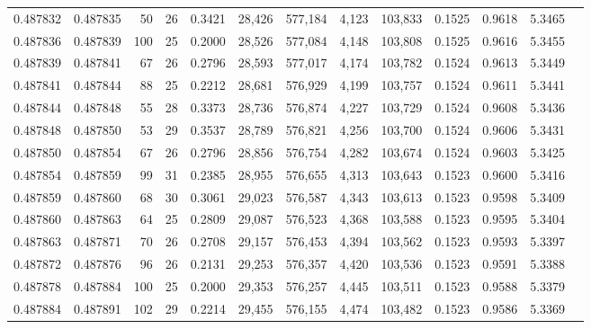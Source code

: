 \begin{tabular}{rrrrrrrrrrrrr}
0.487832 & 0.487835 &  50 &  26 &                                     0.3421 &  28,426 & 577,184 &   4,123 & 103,833 & 0.1525 & 0.9618 & 5.3465 \\
0.487836 & 0.487839 & 100 &  25 &                                     0.2000 &  28,526 & 577,084 &   4,148 & 103,808 & 0.1525 & 0.9616 & 5.3455 \\
0.487839 & 0.487841 &  67 &  26 &                                     0.2796 &  28,593 & 577,017 &   4,174 & 103,782 & 0.1524 & 0.9613 & 5.3449 \\
0.487841 & 0.487844 &  88 &  25 &                                     0.2212 &  28,681 & 576,929 &   4,199 & 103,757 & 0.1524 & 0.9611 & 5.3441 \\
0.487844 & 0.487848 &  55 &  28 &                                     0.3373 &  28,736 & 576,874 &   4,227 & 103,729 & 0.1524 & 0.9608 & 5.3436 \\
0.487848 & 0.487850 &  53 &  29 &                                     0.3537 &  28,789 & 576,821 &   4,256 & 103,700 & 0.1524 & 0.9606 & 5.3431 \\
0.487850 & 0.487854 &  67 &  26 &                                     0.2796 &  28,856 & 576,754 &   4,282 & 103,674 & 0.1524 & 0.9603 & 5.3425 \\
0.487854 & 0.487859 &  99 &  31 &                                     0.2385 &  28,955 & 576,655 &   4,313 & 103,643 & 0.1523 & 0.9600 & 5.3416 \\
0.487859 & 0.487860 &  68 &  30 &                                     0.3061 &  29,023 & 576,587 &   4,343 & 103,613 & 0.1523 & 0.9598 & 5.3409 \\
0.487860 & 0.487863 &  64 &  25 &                                     0.2809 &  29,087 & 576,523 &   4,368 & 103,588 & 0.1523 & 0.9595 & 5.3404 \\
0.487863 & 0.487871 &  70 &  26 &                                     0.2708 &  29,157 & 576,453 &   4,394 & 103,562 & 0.1523 & 0.9593 & 5.3397 \\
0.487872 & 0.487876 &  96 &  26 &                                     0.2131 &  29,253 & 576,357 &   4,420 & 103,536 & 0.1523 & 0.9591 & 5.3388 \\
0.487878 & 0.487884 & 100 &  25 &                                     0.2000 &  29,353 & 576,257 &   4,445 & 103,511 & 0.1523 & 0.9588 & 5.3379 \\
0.487884 & 0.487891 & 102 &  29 &                                     0.2214 &  29,455 & 576,155 &   4,474 & 103,482 & 0.1523 & 0.9586 & 5.3369 \\

\end{tabular}
